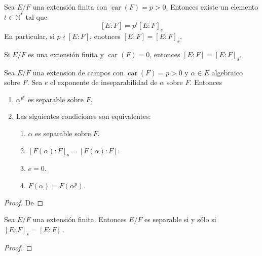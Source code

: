 \documentclass[12pt]{report}
\theoremstyle{largebreak}
\DeclareMathOperator{\car}{car}
\begin{document}
    \begin{propo}
        Sea $E/F$ una extensión finita con $\car(F)=p>0$. Entonces existe un elemento $t\in\mathbb{N}^{*}$ tal que
        \begin{equation}
            \left[E:F\right]=p^t\left[E:F\right]_s
        \end{equation}
        En particular, si $p\nmid \left[E:F\right]$, enotnces $\left[E:F\right]=\left[E:F\right]_s$.
    \end{propo}

    \begin{obs}
        Si $E/F$ es una extensión finita y $\car(F)=0$, entonces $\left[E:F\right]=\left[E:F\right]_s$.
    \end{obs}

    \begin{propo}
        Sea $E/F$ una extension de campos con $\car(F)=p>0$ y $\alpha\in E$ algebraico sobre $F$. Sea $e$ el exponente de inseparabilidad de $\alpha$ sobre $F$. Entonces
        \begin{enumerate}
            \item $\alpha^{p^e}$ es separable sobre $F$.
            \item Las siguientes condiciones son equivalentes:
            \begin{enumerate}
                \item $\alpha$ es separable sobre $F$.
                \item $\left[F(\alpha):F\right]_s=\left[F(\alpha):F\right]$.
                \item $e=0$.
                \item $F(\alpha)=F(\alpha^p)$.
            \end{enumerate}
        \end{enumerate}
    \end{propo}

    \begin{proof}
        De 
    \end{proof}

    \begin{propo}
        Sea $E/F$ una extensión finita. Entonces $E/F$ es separable si y sólo si $\left[E:F\right]_s=\left[E:F\right]$.
    \end{propo}

    \begin{proof}
        
    \end{proof}
\end{document}
